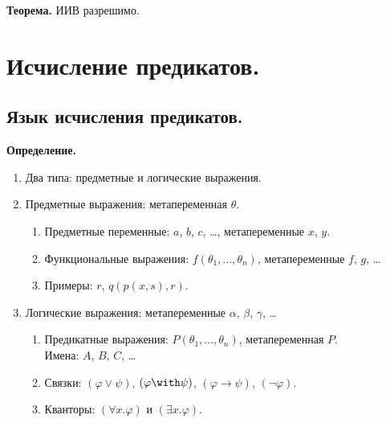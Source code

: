\documentclass[10pt,a4paper,oneside]{article}
\begin{document}
\noindent \textbf{ Теорема. }
ИИВ разрешимо.


\section{Исчисление предикатов.}
\subsection{Язык исчисления предикатов.}
\noindent \textbf{ Определение. }
\begin{enumerate}
\item Два типа: предметные и логические выражения. 
\item Предметные выражения: метапеременная {\color{blue}$\theta$}. 
\begin{enumerate}
\item Предметные переменные: {\color{blue}$a$}, {\color{blue}$b$}, {\color{blue}$c$}, \dots, метапеременные {\color{blue}$x$}, {\color{blue}$y$}. 
\item Функциональные выражения: {\color{blue}$f(\theta_1,\dots,\theta_n)$}, метапеременные {\color{blue}$f$}, {\color{blue}$g$}, \dots\\
\item Примеры: %
  {\color{blue}$r$},
  {\color{blue}$q(p(x,s),r)$}.
\end{enumerate}
\item Логические выражения: метапеременные {\color{blue}$\alpha$}, {\color{blue}$\beta$}, {\color{blue}$\gamma$}, \dots
\begin{enumerate}
\item Предикатные выражения: {\color{blue}$P(\theta_1,\dots,\theta_n)$}, метапеременная {\color{blue}$P$}.\\
Имена: {\color{blue}$A$}, {\color{blue}$B$}, {\color{blue}$C$}, \dots  %
\item Связки: {\color{blue}$(\varphi\vee\psi)$}, {\color{blue}$(\varphi\with\psi)$}, {\color{blue}$(\varphi\rightarrow\psi)$}, 
   {\color{blue}$(\neg\varphi)$}.
\item Кванторы: {\color{blue}$(\forall x.\varphi)$} и {\color{blue}$(\exists x.\varphi)$}.
\end{enumerate}
\end{enumerate}
\end{document}
